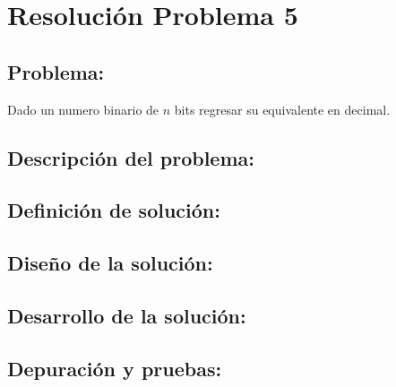 \section{Resolución Problema 5}
\subsection{Problema:}
Dado un numero binario de $n$ bits regresar su equivalente en decimal.

\subsection{\textbf{Descripción del problema:}}

\subsection{\textbf{Definición de solución:}}

\subsection{\textbf{Diseño de la solución:}}

\subsection{\textbf{Desarrollo de la solución:}}

\subsection{\textbf{Depuración y pruebas:}}